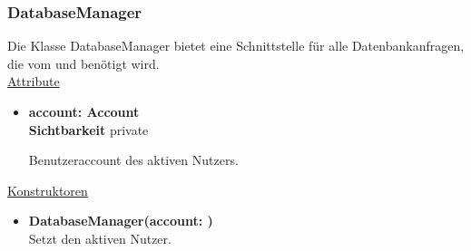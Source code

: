 \subsubsection{DatabaseManager} \label{service:klasse:DatabaseManager}
Die Klasse DatabaseManager bietet eine Schnittstelle für alle Datenbankanfragen, die vom  und  benötigt wird. \hfill\\

\underline{Attribute}
\begin{itemize}
\itemsep0pt
\item \textbf{account: Account} \hfill\\ 
\textbf{Sichtbarkeit} private

Benutzeraccount des aktiven Nutzers.
\end{itemize}

\underline{Konstruktoren}
\begin{itemize}
\itemsep0pt
\item \textbf{DatabaseManager(account: )} \hfill\\
Setzt den aktiven Nutzer.
\end{itemize}

